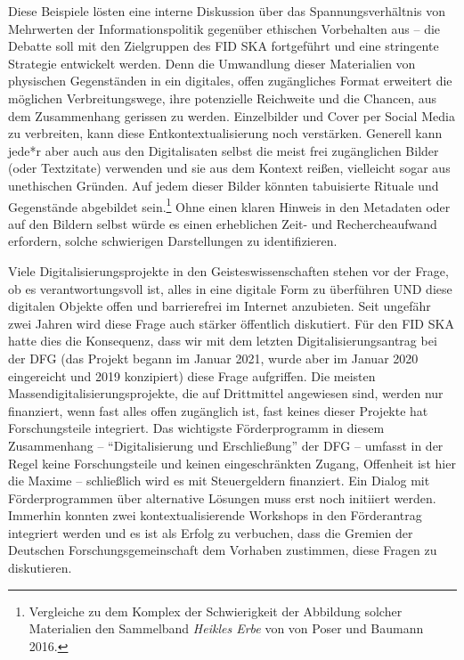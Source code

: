 \documentclass[a4paper,
fontsize=11pt,
oneside,
numbers=noperiodatend,
parskip=half-,
bibliography=totoc,
final
]{scrartcl}
\begin{document}
Diese Beispiele lösten eine interne Diskussion über das
Spannungsverhältnis von Mehrwerten der Informationspolitik gegenüber
ethischen Vorbehalten aus -- die Debatte soll mit den Zielgruppen des
FID SKA fortgeführt und eine stringente Strategie entwickelt werden.
Denn die Umwandlung dieser Materialien von physischen Gegenständen in
ein digitales, offen zugängliches Format erweitert die möglichen
Verbreitungswege, ihre potenzielle Reichweite und die Chancen, aus dem
Zusammenhang gerissen zu werden. Einzelbilder und Cover per Social Media
zu verbreiten, kann diese Entkontextualisierung noch verstärken.
Generell kann jede*r aber auch aus den Digitalisaten selbst die meist
frei zugänglichen Bilder (oder Textzitate) verwenden und sie aus dem
Kontext reißen, vielleicht sogar aus unethischen Gründen. Auf jedem
dieser Bilder könnten tabuisierte Rituale und Gegenstände abgebildet
sein.\footnote{Vergleiche zu dem Komplex der Schwierigkeit der Abbildung
  solcher Materialien den Sammelband \emph{Heikles Erbe} von von Poser
  und Baumann 2016.} Ohne einen klaren Hinweis in den Metadaten oder auf
den Bildern selbst würde es einen erheblichen Zeit- und Rechercheaufwand
erfordern, solche schwierigen Darstellungen zu identifizieren.

Viele Digitalisierungsprojekte in den Geisteswissenschaften stehen vor
der Frage, ob es verantwortungsvoll ist, alles in eine digitale Form zu
überführen UND diese digitalen Objekte offen und barrierefrei im
Internet anzubieten. Seit ungefähr zwei Jahren wird diese Frage auch
stärker öffentlich diskutiert. Für den FID SKA hatte dies die
Konsequenz, dass wir mit dem letzten Digitalisierungsantrag bei der DFG
(das Projekt begann im Januar 2021, wurde aber im Januar 2020
eingereicht und 2019 konzipiert) diese Frage aufgriffen. Die meisten
Massendigitalisierungsprojekte, die auf Drittmittel angewiesen sind,
werden nur finanziert, wenn fast alles offen zugänglich ist, fast keines
dieser Projekte hat Forschungsteile integriert. Das wichtigste
Förderprogramm in diesem Zusammenhang -- \enquote{Digitalisierung und
Erschließung} der DFG -- umfasst in der Regel keine Forschungsteile und
keinen eingeschränkten Zugang, Offenheit ist hier die Maxime --
schließlich wird es mit Steuergeldern finanziert. Ein Dialog mit
Förderprogrammen über alternative Lösungen muss erst noch initiiert
werden. Immerhin konnten zwei kontextualisierende Workshops in den
Förderantrag integriert werden und es ist als Erfolg zu verbuchen, dass
die Gremien der Deutschen Forschungsgemeinschaft dem Vorhaben zustimmen,
diese Fragen zu diskutieren.
\end{document}
